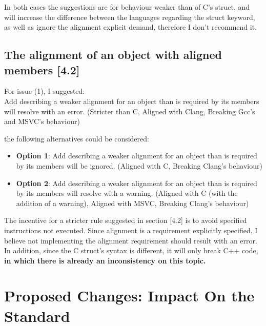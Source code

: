 \documentclass[11pt]{article}
\begin{document}
In both cases the suggestions are for behaviour weaker than of C's struct, and will increase the difference between the languages regarding the struct keyword, as well as ignore the alignment explicit demand, therefore I don't recommend it. 

\subsection{The alignment of an object with aligned members [4.2]}

For issue (1), I suggested: \\
Add describing a weaker alignment for an object than is required by its members will resolve with an error. (Stricter than C, Aligned with Clang, Breaking Gcc's and MSVC's behaviour)


the following alternatives could be considered:
\begin{itemize}
    \item \textbf{Option 1}: Add describing a weaker alignment for an object than is required by its members will be ignored. (Aligned with C, Breaking Clang's behaviour)
    
    \item \textbf{Option 2}: Add describing a weaker alignment for an object than is required by its members will resolve with a warning. (Aligned with C (with the addition of a warning), Aligned with MSVC, Breaking Clang's behaviour)
\end{itemize}

The incentive for a stricter rule suggested in section [4.2] is to avoid specified instructions not executed. Since alignment is a requirement explicitly specified, I believe not implementing the alignment requirement should result with an error. In addition, since the C struct's syntax is different, it will only break C++ code, \textbf{in which there is already an inconsistency on this topic.}



\section{Proposed Changes: Impact On the Standard}
\end{document}
